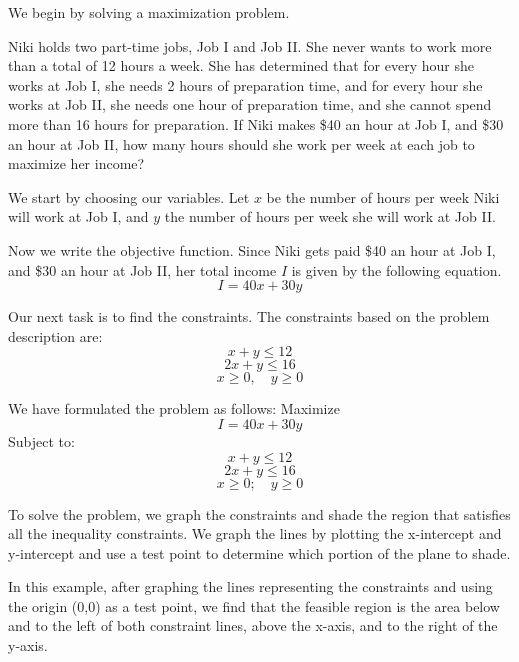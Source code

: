 We begin by solving a maximization problem.

\begin{example}
    Niki holds two part-time jobs, Job I and Job II. She never wants to work more than a total of 12 hours a week. She has determined that for every hour she works at Job I, she needs 2 hours of preparation time, and for every hour she works at Job II, she needs one hour of preparation time, and she cannot spend more than 16 hours for preparation.
    If Niki makes \$40 an hour at Job I, and \$30 an hour at Job II, how many hours should she work per week at each job to maximize her income?
\end{example}

\begin{solution}
    We start by choosing our variables.
    Let \( x \) be the number of hours per week Niki will work at Job I, and \( y \) the number of hours per week she will work at Job II.

    Now we write the objective function. Since Niki gets paid \$40 an hour at Job I, and \$30 an hour at Job II, her total income \( I \) is given by the following equation.
    \[ I = 40x + 30y \]

    Our next task is to find the constraints. The constraints based on the problem description are:
    \[ x + y \leq 12 \]
    \[ 2x + y \leq 16 \]
    \[ x \geq 0, \quad y \geq 0 \]

    We have formulated the problem as follows:
    Maximize
    \[ I = 40x + 30y \]
    Subject to:
    \[ x + y \leq 12 \]
    \[ 2x + y \leq 16 \]
    \[ x \geq 0; \quad y \geq 0 \]

    To solve the problem, we graph the constraints and shade the region that satisfies all the inequality constraints. We graph the lines by plotting the x-intercept and y-intercept and use a test point to determine which portion of the plane to shade.

    In this example, after graphing the lines representing the constraints and using the origin (0,0) as a test point, we find that the feasible region is the area below and to the left of both constraint lines, above the x-axis, and to the right of the y-axis.
\end{solution}

